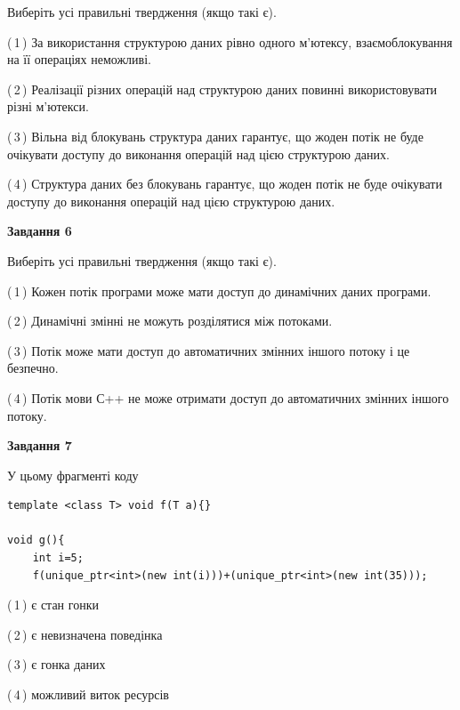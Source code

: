 \documentclass[12pt, ukrainian]{article}
\begin{document}
\begin {large}
{Виберіть усі правильні твердження (якщо такі є).\par
\vspace{2mm}

(\,1\,) За використання структурою даних рівно одного м’ютексу, взаємоблокування на її операціях неможливі.%

(\,2\,) Реалізації різних операцій над структурою даних повинні використовувати різні м’ютекси.%

(\,3\,) Вільна від блокувань структура даних гарантує, що жоден потік не буде очікувати доступу до виконання операцій над цією структурою даних.%

(\,4\,) Структура даних без блокувань гарантує, що жоден потік не буде очікувати доступу до виконання операцій над цією структурою даних.%
\newpage


\begin{center}
\textbf{Завдання 6}
\end{center}

Виберіть усі правильні твердження (якщо такі є).\par
\vspace{2mm}

(\,1\,) Кожен потік програми може мати доступ до динамічних даних програми.%

(\,2\,) Динамічні змінні не можуть розділятися між потоками.%

(\,3\,) Потік може мати доступ до автоматичних змінних іншого потоку і це безпечно.%

(\,4\,) Потік мови С++ не може отримати доступ до автоматичних змінних іншого потоку.%


\begin{center}
\textbf{Завдання 7}
\end{center}

У цьому фрагменті коду
\begin{verbatim}
template <class T> void f(T a){}

void g(){
    int i=5;
    f(unique_ptr<int>(new int(i)))+(unique_ptr<int>(new int(35)));
\end{verbatim}
(\,1\,) є стан гонки%

(\,2\,) є невизначена поведінка%

(\,3\,) є гонка даних%

(\,4\,) можливий виток ресурсів%

}
\end {large}

\vspace{4mm}
\newpage
\end{document}
